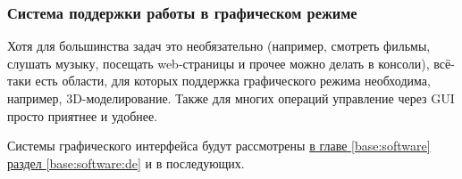 \subsubsection{Система поддержки работы в графическом режиме}\label{base:os:structure:additional:gui}
Хотя для большинства задач это необязательно (например, смотреть фильмы, слушать музыку, посещать web-страницы и прочее можно делать в консоли), всё-таки есть области, для которых поддержка графического режима необходима, например, 3D-моделирование. Также для многих операций управление через GUI просто приятнее и удобнее.

Системы графического интерфейса будут рассмотрены \hyperref[base:software:de]{в главе \ref*{base:software} раздел \ref*{base:software:de}} и в последующих.